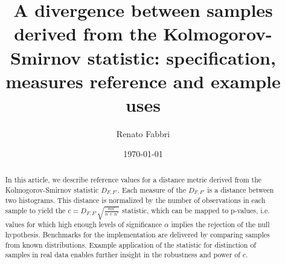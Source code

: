 \documentclass[%
	aip,
	jmp,%
	amsmath,amssymb,
	reprint,%
]{revtex4-1}
\begin{document}

\title[Divergence between samples]{A divergence between samples
derived from the Kolmogorov-Smirnov statistic: specification, measures reference and example uses}%
\author{Renato Fabbri}%

\date{\today}%

\begin{abstract}
In this article, we describe reference values for a distance metric
derived from the Kolmogorov-Smirnov statistic $D_{F,F'}$.
Each measure of the $D_{F,F'}$ is a distance between two histograms.
This distance is normalized by the number of observations in each sample
to yield the $c=D_{F,F'}\sqrt{\frac{n n'}{n+n'}}$ statistic,
which can be mapped to p-values, i.e. values for which 
high enough levels of significance $\alpha$ implies the rejection of the null hypothesis.
Benchmarks for the implementation are delivered by comparing samples from known distributions.
Example application of the statistic for distinction of samples in real data enables further
insight in the robustness and power of $c$.
\end{abstract}

\maketitle
\end{document}
